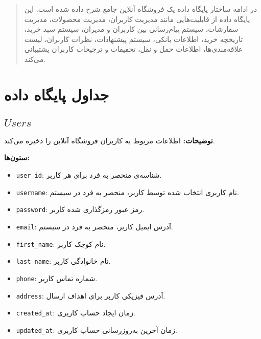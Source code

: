 \documentclass[12pt]{article}
\begin{document}
\fontsize{12pt}{14pt}\selectfont




\renewcommand{\abstractname}{طراحی پایگاه داده فروشگاه آنلاین}
\begin{abstract}
در ادامه ساختار پایگاه داده یک فروشگاه آنلاین جامع شرح داده شده است. این پایگاه داده از قابلیت‌هایی مانند مدیریت کاربران، مدیریت محصولات، مدیریت سفارشات، سیستم پیام‌رسانی بین کاربران و مدیران، سیستم سبد خرید، تاریخچه خرید، اطلاعات بانکی، سیستم پیشنهادات، نظرات کاربران، لیست علاقه‌مندی‌ها، اطلاعات حمل و نقل، تخفیفات و ترجیحات کاربران پشتیبانی می‌کند.
\end{abstract}

\section{جداول پایگاه داده}

\subsection{ \(Users\)}

\textbf{توضیحات:} اطلاعات مربوط به کاربران فروشگاه آنلاین را ذخیره می‌کند.

\textbf{ستون‌ها:}
\begin{itemize}
    \item \texttt{user\_id}: شناسه‌ی منحصر به فرد برای هر کاربر.
    \item \texttt{username}: نام کاربری انتخاب شده توسط کاربر، منحصر به فرد در سیستم.
    \item \texttt{password}: رمز عبور رمزگذاری شده کاربر.
    \item \texttt{email}: آدرس ایمیل کاربر، منحصر به فرد در سیستم.
    \item \texttt{first\_name}: نام کوچک کاربر.
    \item \texttt{last\_name}: نام خانوادگی کاربر.
    \item \texttt{phone}: شماره تماس کاربر.
    \item \texttt{address}: آدرس فیزیکی کاربر برای اهداف ارسال.
    \item \texttt{created\_at}: زمان ایجاد حساب کاربری.
    \item \texttt{updated\_at}: زمان آخرین به‌روزرسانی حساب کاربری.
\end{itemize}
\end{document}
